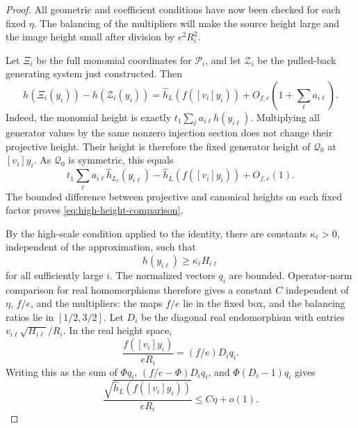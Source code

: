 \begin{proof}
All geometric and coefficient conditions have now been checked for
each fixed $\eta$.  The balancing of the multipliers will make the
source height large and the image height small after division by
$e^2R_i^2$.

Let $\Xi_i$ be the full monomial coordinates for $\mathcal P_i$, and
let $\mathcal Z_i$ be the pulled-back generating system just constructed.
Then
\begin{equation}\label{eq:high-height-comparison}
 h(\Xi_i(y_i))-h(\mathcal Z_i(y_i))
  =\widehat h_L(f([v_i]y_i))
       +O_{f,e}\left(1+\sum_\ell a_{i\ell}\right).
\end{equation}
Indeed, the monomial height is exactly
$t_1\sum_\ell a_{i\ell}h(y_{i\ell})$.
Multiplying all generator values by the same nonzero injection section
does not change their projective height.  Their height is therefore
the fixed generator height of $\mathcal Q_0$ at $[v_i]y_i$.
As $\mathcal Q_0$ is symmetric, this equals
\[
 t_1\sum_\ell a_{i\ell}\widehat h_{L_\ell}(y_{i\ell})
      -\widehat h_L(f([v_i]y_i))+O_{f,e}(1).
\]
The bounded difference between projective and canonical heights on
each fixed factor proves \eqref{eq:high-height-comparison}.

By the high-scale condition applied to the identity, there are constants
$\kappa_\ell>0$, independent of the approximation, such that
\[
 h(y_{i\ell})\ge\kappa_\ell H_{i\ell}
\]
for all sufficiently large $i$.  The normalized vectors $q_i$ are
bounded.  Operator-norm comparison for real homomorphisms therefore
gives a constant $C$ independent of $\eta$, $f/e$, and the multipliers:
the maps $f/e$ lie in the fixed box, and the balancing ratios lie in
$[1/2,3/2]$.
Let $D_i$ be the diagonal real endomorphism with entries
$v_{i\ell}\sqrt{H_{i\ell}}/R_i$.  In the real height space,
\[
 \frac{f([v_i]y_i)}{eR_i}=(f/e)D_iq_i.
\]
Writing this as the sum of $\Phi q_i$,
$(f/e-\Phi)D_iq_i$, and $\Phi(D_i-1)q_i$ gives
\begin{equation}\label{eq:high-small-image}
 \frac{\sqrt{\widehat h_L(f([v_i]y_i))}}{eR_i}
   \le C\eta+o(1).
\end{equation}


\end{proof}

